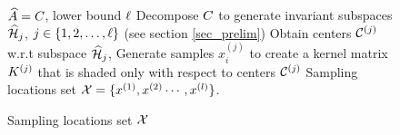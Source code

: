
\begin{figure}[t!]
	\begin{algorithm}[H]
		\caption{Sampling locations set $ \mathcal{X} $}
		\label{alg:samples}
		\begin{algorithmic}
				 $ \widehat{A} =C $, lower bound $\ell$
				\STATE Decompose $ C $ to generate invariant subspaces $ \widehat{\mathcal{H}}_{j} $, $ j\in \{1,2,\dots,\ell\} $ (see section \ref{sec_prelim})
				\STATE Obtain centers $\mathcal{C}^{(j)}$ w.r.t subspace $ \widehat{\mathcal{H}}_{j} $,
				\STATE Generate samples $x_i^{(j)}$ to create a kernel matrix $K^{(j)}$ that is shaded only with respect to centers $\mathcal{C}^{(j)}$
				\ENDFOR
				 Sampling locations set  $\mathcal{X} =\{x^{(1)}, x^{(2)}\cdots,x^{(l)}\} $.
		\end{algorithmic}
	\end{algorithm}
\end{figure}


